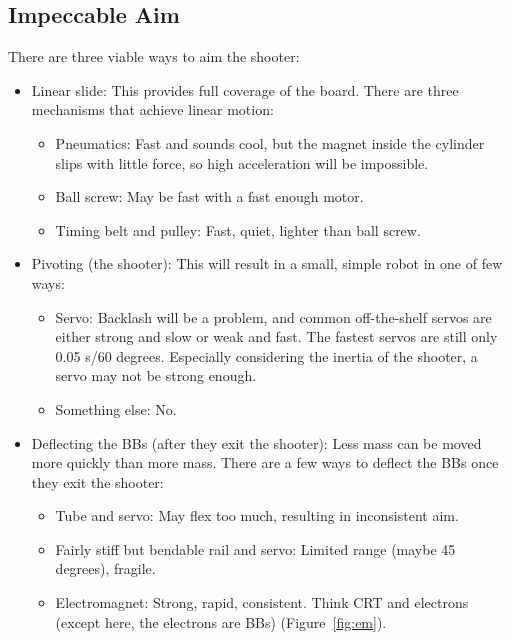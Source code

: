 \documentclass[10pt,letterpaper]{article}
\begin{document}
\subsection*{Impeccable Aim}

There are three viable ways to aim the shooter:

\begin{itemize}
	\item Linear slide: This provides full coverage of the board. There are
		three mechanisms that achieve linear motion:
		\begin{itemize}
			\item Pneumatics: Fast and sounds cool, but the magnet inside the
				cylinder slips with little force, so high acceleration will be
				impossible.
			\item Ball screw: May be fast with a fast enough motor.
			\item Timing belt and pulley: Fast, quiet, lighter than ball screw.
		\end{itemize}

	\item Pivoting (the shooter): This will result in a small, simple robot in
		one of few ways:
		\begin{itemize}
			\item Servo: Backlash will be a problem, and common off-the-shelf
				servos are either strong and slow or weak and fast. The fastest
				servos are still only 0.05 s/60 degrees. Especially considering
				the inertia of the shooter, a servo may not be strong enough.
			\item Something else: No.
		\end{itemize}

	\item Deflecting the BBs (after they exit the shooter): Less mass can be
		moved more quickly than more mass. There are a few ways to deflect the
		BBs once they exit the shooter:
		\begin{itemize}
			\item Tube and servo: May flex too much, resulting in inconsistent aim.
			\item Fairly stiff but bendable rail and servo: Limited range
				(maybe 45 degrees), fragile.
			\item Electromagnet: Strong, rapid, consistent. Think CRT and
				electrons (except here, the electrons are BBs) (Figure~\ref{fig:em}).
		\end{itemize}
\end{itemize}
\end{document}
